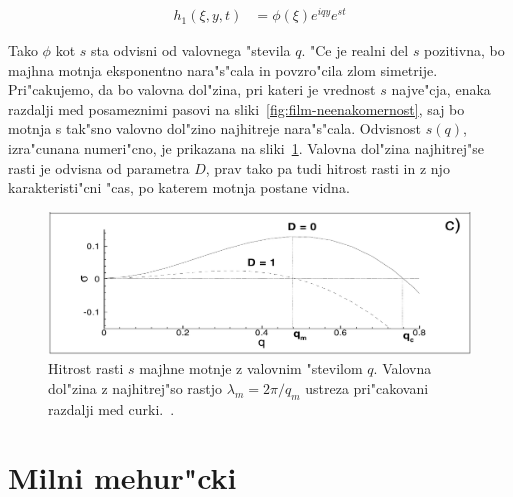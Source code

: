 \documentclass[a4paper,12pt]{article}
\begin{document}
\begin{align}
  h_1(\xi, y, t) &= \phi(\xi) e^{iqy} e^{s t}
\end{align}

Tako $\phi$ kot $s$ sta odvisni od valovnega "stevila $q$. "Ce je realni del $s$ pozitivna, bo majhna motnja eksponentno nara"s"cala in povzro"cila zlom simetrije. Pri"cakujemo, da bo valovna dol"zina, pri kateri je vrednost $s$ najve"cja, enaka razdalji med posameznimi pasovi na sliki~\ref{fig:film-neenakomernost}, saj bo motnja s tak"sno valovno dol"zino najhitreje nara"s"cala. Odvisnost $s(q)$, izra"cunana numeri"cno, je prikazana na sliki~\ref{fig:film-rast}. Valovna dol"zina najhitrej"se rasti je odvisna od parametra $D$, prav tako pa tudi hitrost rasti in z njo karakteristi"cni "cas, po katerem motnja postane vidna. 


\begin{figure}[h]
 \centering
 \includegraphics[width=.8\textwidth]{./Slike/film-stabilnost}
 \caption{Hitrost rasti $s$ majhne motnje z valovnim "stevilom $q$. Valovna dol"zina z najhitrej"so rastjo $\lambda_m = 2\pi/q_m$ ustreza pri"cakovani razdalji med curki.~\cite{kondic}. }
 \label{fig:film-rast}
\end{figure}

\newpage
\section{Milni mehur"cki}
\end{document}
